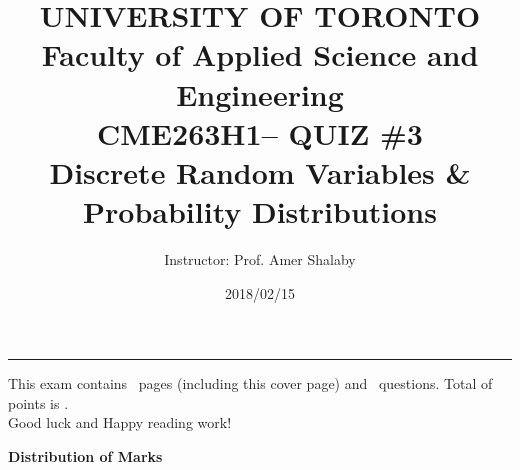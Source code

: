 \documentclass[letterpaper,12pt,addpoints]{exam}
\newcommand{\university}{UNIVERSITY OF TORONTO}
\newcommand{\faculty}{Faculty of Applied Science and Engineering}
\newcommand{\class}{CME263H1}
\newcommand{\examnum}{QUIZ \#3}
\newcommand{\content}{Discrete Random Variables \& Probability Distributions}
\newcommand{\examdate}{2018/02/15}
\begin{document}
\title{\Large \textbf{\university\\ \faculty\\
\bigskip
\class -- \examnum \\ \content}}
\author{Instructor: Prof. Amer Shalaby}
\date{\examdate}
\maketitle
\begin{flushleft}
\medskip
{}
\end{flushleft}
\noindent \rule{\textwidth}{1pt}

\noindent This exam contains \numpages\ pages (including this cover page) and \numquestions\ questions. Total of points is \numpoints.\\
Good luck and Happy reading work!

\begin{center}
\textbf{Distribution of Marks}\\
\medskip
\gradetable[v][questions]
\end{center}
\end{document}
